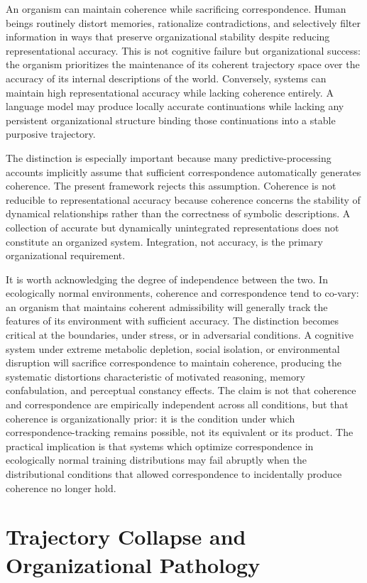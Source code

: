 \documentclass[12pt,a4paper]{report}
\theoremstyle{flyxion}
\begin{document}
An organism can maintain coherence while sacrificing correspondence. Human beings routinely distort memories, rationalize contradictions, and selectively filter information in ways that preserve organizational stability despite reducing representational accuracy. This is not cognitive failure but organizational success: the organism prioritizes the maintenance of its coherent trajectory space over the accuracy of its internal descriptions of the world. Conversely, systems can maintain high representational accuracy while lacking coherence entirely. A language model may produce locally accurate continuations while lacking any persistent organizational structure binding those continuations into a stable purposive trajectory.

The distinction is especially important because many predictive-processing accounts implicitly assume that sufficient correspondence automatically generates coherence. The present framework rejects this assumption. Coherence is not reducible to representational accuracy because coherence concerns the stability of dynamical relationships rather than the correctness of symbolic descriptions. A collection of accurate but dynamically unintegrated representations does not constitute an organized system. Integration, not accuracy, is the primary organizational requirement.

It is worth acknowledging the degree of independence between the two. In ecologically normal environments, coherence and correspondence tend to co-vary: an organism that maintains coherent admissibility will generally track the features of its environment with sufficient accuracy. The distinction becomes critical at the boundaries, under stress, or in adversarial conditions. A cognitive system under extreme metabolic depletion, social isolation, or environmental disruption will sacrifice correspondence to maintain coherence, producing the systematic distortions characteristic of motivated reasoning, memory confabulation, and perceptual constancy effects. The claim is not that coherence and correspondence are empirically independent across all conditions, but that coherence is organizationally prior: it is the condition under which correspondence-tracking remains possible, not its equivalent or its product. The practical implication is that systems which optimize correspondence in ecologically normal training distributions may fail abruptly when the distributional conditions that allowed correspondence to incidentally produce coherence no longer hold.

\section{Trajectory Collapse and Organizational Pathology}
\end{document}
